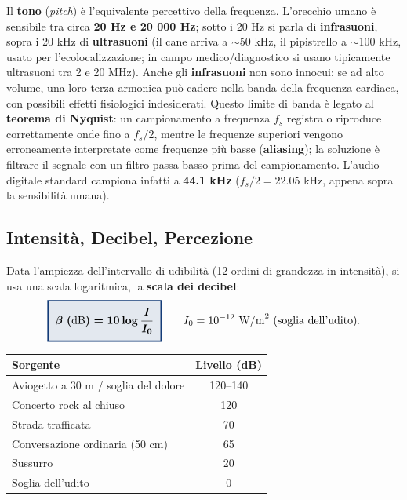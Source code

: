\documentclass[a4paper,11pt]{article}
\newcommand{\keyeq}[1]{{\setlength{\fboxsep}{6pt}\setlength{\fboxrule}{1.3pt}\fcolorbox{chapblue}{chapblue!12}{\boldmath$\displaystyle #1$}}}
\begin{document}
Il \textbf{tono} (\emph{pitch}) è l'equivalente percettivo della frequenza. L'orecchio umano è sensibile tra circa \textbf{20 Hz e 20 000 Hz}; sotto i 20 Hz si parla di \textbf{infrasuoni}, sopra i 20 kHz di \textbf{ultrasuoni} (il cane arriva a $\sim$50 kHz, il pipistrello a $\sim$100 kHz, usato per l'ecolocalizzazione; in campo medico/diagnostico si usano tipicamente ultrasuoni tra 2 e 20 MHz). Anche gli \textbf{infrasuoni} non sono innocui: se ad alto volume, una loro terza armonica può cadere nella banda della frequenza cardiaca, con possibili effetti fisiologici indesiderati. Questo limite di banda è legato al \textbf{teorema di Nyquist}: un campionamento a frequenza $f_s$ registra o riproduce correttamente onde fino a $f_s/2$, mentre le frequenze superiori vengono erroneamente interpretate come frequenze più basse (\textbf{aliasing}); la soluzione è filtrare il segnale con un filtro passa-basso prima del campionamento. L'audio digitale standard campiona infatti a \textbf{44.1 kHz} ($f_s/2=22.05$ kHz, appena sopra la sensibilità umana).

\subsection{Intensità, Decibel, Percezione}

Data l'ampiezza dell'intervallo di udibilità (12 ordini di grandezza in intensità), si usa una scala logaritmica, la \textbf{scala dei decibel}:
\[
\keyeq{\beta\ (\text{dB}) = 10\log\frac{I}{I_0}} \qquad I_0 = 10^{-12}\ \text{W/m}^2 \ \text{(soglia dell'udito)}.
\]

\begin{center}
\begin{minipage}{\linewidth}
\centering
\small
\begin{tabular}{lc}
\toprule
\textbf{Sorgente} & \textbf{Livello (dB)} \\
\midrule
Aviogetto a 30 m / soglia del dolore & 120--140 \\
Concerto rock al chiuso & 120 \\
Strada trafficata & 70 \\
Conversazione ordinaria (50 cm) & 65 \\
Sussurro & 20 \\
Soglia dell'udito & 0 \\
\bottomrule
\end{tabular}
\end{minipage}
\end{center}
\end{document}
